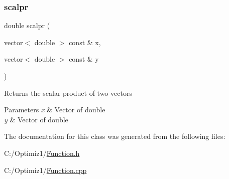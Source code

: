 \subsubsection{\texorpdfstring{scalpr}{scalpr}}
{\footnotesize\ttfamily double scalpr (\begin{DoxyParamCaption}\item[{vector$<$ double $>$ const \&}]{x,  }\item[{vector$<$ double $>$ const \&}]{y }\end{DoxyParamCaption})\hspace{0.3cm}{\ttfamily [friend]}}

Returns the scalar product of two vectors 
\begin{DoxyParams}{Parameters}
{\em x} & Vector of double \\
\hline
{\em y} & Vector of double \\
\hline
\end{DoxyParams}


The documentation for this class was generated from the following files\+:\begin{DoxyCompactItemize}
\item 
C\+:/\+Optimiz1/\hyperlink{_function_8h}{Function.\+h}\item 
C\+:/\+Optimiz1/\hyperlink{_function_8cpp}{Function.\+cpp}\end{DoxyCompactItemize}
